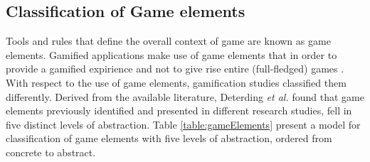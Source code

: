 \subsection{Classification of Game elements}
Tools and rules that define the overall context of game are known as game elements. %
Gamified  applications  make use of game elements that in order to provide a gamified expirience and not to  give  rise entire (full-fledged) games \cite{deterding2011game}. With respect to the use of game elements, gamification studies classified them differently. Derived from the available literature, Deterding \textit{et al.} found that game elements previously identified and presented in different research studies, fell in five distinct levels of abstraction. Table \ref{table:gameElements} present a model for classification of game elements with five levels of abstraction, ordered from concrete to abstract.

